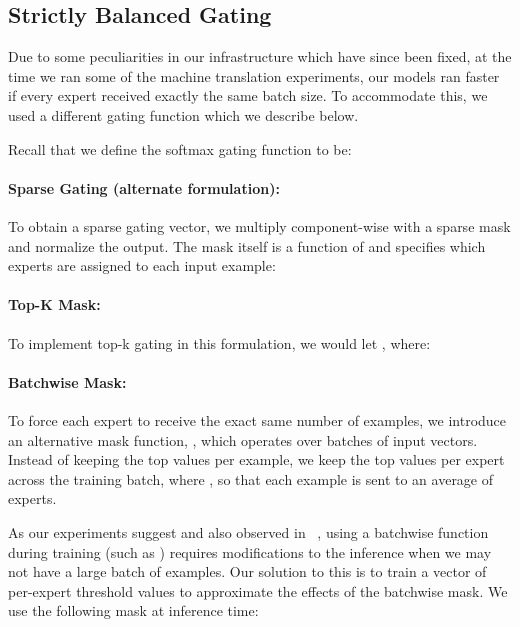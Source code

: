 \documentclass{article} \pdfoutput=1
\begin{document}
\subsection{Strictly Balanced Gating}\label{sec:batchwisemask} 

Due to some peculiarities in our infrastructure which have since been fixed, at the time we ran some of the machine translation experiments, our models ran faster if every expert received exactly the same batch size.  To accommodate this, we used a different gating function which we describe below.  

Recall that we define the softmax gating function to be:



\paragraph{Sparse Gating (alternate formulation):} To obtain a sparse gating vector, we multiply  component-wise with a sparse mask  and normalize the output. The mask itself is a function of  and specifies which experts are assigned to each input example: 



\paragraph{Top-K Mask:} To implement top-k gating in this formulation, we would let , where:



\paragraph{Batchwise Mask:} To force each expert to receive the exact same number of examples, we introduce an alternative mask function, , which operates over batches of input vectors.   Instead of keeping the top  values per example, we keep the top  values per expert across the training batch, where , so that each example is sent to an average of  experts.



As our experiments suggest and also observed in ~\citep{DBLP:journals/corr/IoffeS15}, using a batchwise function during training (such as ) requires modifications to the inference when we may not have a large batch of examples. Our solution to this is to train a vector  of per-expert threshold values to approximate the effects of the batchwise mask.  We use the following mask at inference time:
\end{document}
